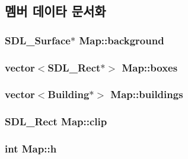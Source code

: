 \subsection{멤버 데이타 문서화}
\hypertarget{class_map_a4e5b5f8caa592075319b99fc221669da}{
\subsubsection[{background}]{\setlength{\rightskip}{0pt plus 5cm}\-S\-D\-L\-\_\-\-Surface$\ast$ {\bf \-Map\-::background}}}\label{class_map_a4e5b5f8caa592075319b99fc221669da}
\hypertarget{class_map_af3b1ee73a67bb6f90056f28a57c20480}{
\subsubsection[{boxes}]{\setlength{\rightskip}{0pt plus 5cm}vector$<$\-S\-D\-L\-\_\-\-Rect$\ast$$>$ {\bf \-Map\-::boxes}}}\label{class_map_af3b1ee73a67bb6f90056f28a57c20480}
\hypertarget{class_map_a40e2372d08f74add7a26f60e28e3d6f7}{
\subsubsection[{buildings}]{\setlength{\rightskip}{0pt plus 5cm}vector$<${\bf \-Building}$\ast$$>$ {\bf \-Map\-::buildings}}}\label{class_map_a40e2372d08f74add7a26f60e28e3d6f7}
\hypertarget{class_map_a2a7e44e75ee69ac6f00740b1a672dcfc}{
\subsubsection[{clip}]{\setlength{\rightskip}{0pt plus 5cm}\-S\-D\-L\-\_\-\-Rect {\bf \-Map\-::clip}}}\label{class_map_a2a7e44e75ee69ac6f00740b1a672dcfc}
\hypertarget{class_map_a58a2d68b31ac0705cc12ae1a8c9db137}{
\subsubsection[{h}]{\setlength{\rightskip}{0pt plus 5cm}int {\bf \-Map\-::h}}}\label{class_map_a58a2d68b31ac0705cc12ae1a8c9db137}
